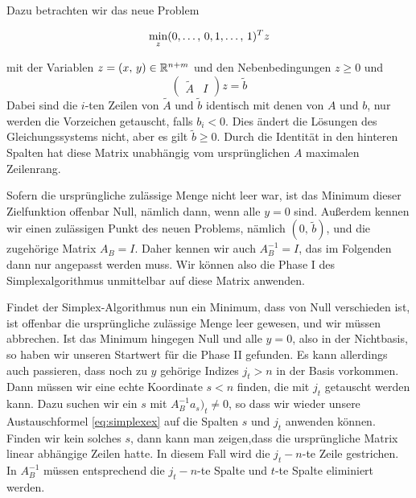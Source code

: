Dazu betrachten wir das neue Problem
{\samepage\vspace{0.2em}\begin{equation}
  \min_z (\tikzlabel{xl}0,\ldots,\,0\tikzlabel{xr},
  \tikzlabel{yl}1,\ldots,\,1\tikzlabel{yr})^Tz
\end{equation}
}
mit der Variablen $z=(x,\,y)\in\mathbb{R}^{n+m}$ und den Nebenbedingungen $z\ge 0$
und
\begin{equation*}
  \begin{pmatrix}
    \tilde{A} & I 
  \end{pmatrix}
  z =
  \tilde{b}
\end{equation*}
Dabei sind die $i$-ten Zeilen von $\tilde{A}$ und $\tilde{b}$
identisch mit denen von $A$ und $b$, nur werden die Vorzeichen
getauscht, falls $b_i<0$. Dies ändert die Lösungen des
Gleichungssystems nicht, aber es gilt $\tilde{b}\ge 0$. Durch die
Identität in den hinteren Spalten hat diese Matrix unabhängig vom
ursprünglichen $A$ maximalen Zeilenrang.

Sofern die ursprüngliche zulässige Menge nicht leer war, ist das
Minimum dieser Zielfunktion offenbar Null, nämlich dann, wenn alle
$y=0$ sind. Außerdem kennen wir einen zulässigen Punkt des neuen
Problems, nämlich $(0,\,\tilde{b})$, und die zugehörige Matrix
$A_B=I$.  Daher kennen wir auch $A_B^{-1}=I$, das im Folgenden dann
nur angepasst werden muss. Wir können also die Phase I des
Simplexalgorithmus unmittelbar auf diese Matrix anwenden.

Findet der Simplex-Algorithmus nun ein Minimum, dass von Null
verschieden ist, ist offenbar die ursprüngliche zulässige Menge leer
gewesen, und wir müssen abbrechen. Ist das Minimum hingegen Null und
alle $y=0$, also in der Nichtbasis, so haben wir unseren Startwert für
die Phase II gefunden. Es kann allerdings auch passieren, dass noch zu
$y$ gehörige Indizes $j_t>n$ in der Basis vorkommen. Dann müssen wir
eine echte Koordinate $s<n$ finden, die mit $j_t$ getauscht werden
kann. Dazu suchen wir ein $s$ mit $A_B^{-1}a_s)_t\neq 0$, so dass wir
wieder unsere Austauschformel \eqref{eq:simplexex} auf die Spalten $s$
und $j_t$ anwenden können. Finden wir kein solches $s$, dann kann man
zeigen,dass die ursprüngliche Matrix linear abhängige Zeilen hatte. In
diesem Fall wird die $j_t-n$-te Zeile gestrichen. In $A_B^{-1}$ müssen
entsprechend die $j_t-n$-te Spalte und $t$-te Spalte eliminiert
werden.

